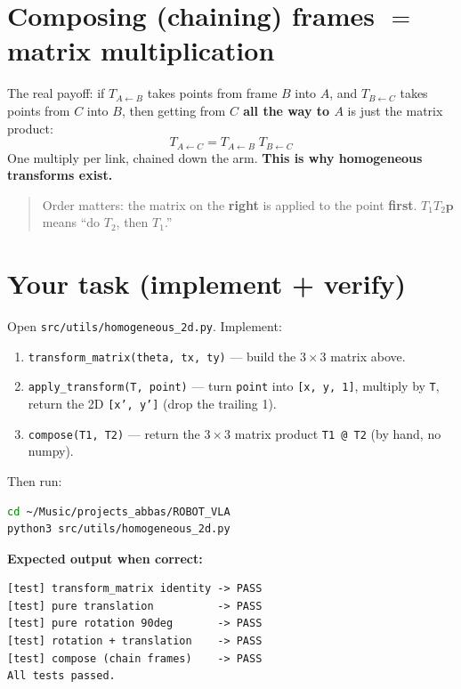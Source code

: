 \documentclass[11pt]{article}
\begin{document}
\section{Composing (chaining) frames $=$ matrix multiplication}

The real payoff: if $T_{A\leftarrow B}$ takes points from frame $B$ into $A$, and
$T_{B\leftarrow C}$ takes points from $C$ into $B$, then getting from \textbf{$C$
all the way to $A$} is just the matrix product:
\[
  T_{A\leftarrow C} = T_{A\leftarrow B}\; T_{B\leftarrow C}
\]
One multiply per link, chained down the arm. \textbf{This is why homogeneous
transforms exist.}

\begin{quote}
Order matters: the matrix on the \textbf{right} is applied to the point
\textbf{first}. $T_1 T_2 \mathbf{p}$ means ``do $T_2$, then $T_1$.''
\end{quote}

\section{Your task (implement + verify)}

Open \texttt{src/utils/homogeneous\_2d.py}. Implement:
\begin{enumerate}[leftmargin=*]
  \item \texttt{transform\_matrix(theta, tx, ty)} --- build the $3\times 3$ matrix
  above.
  \item \texttt{apply\_transform(T, point)} --- turn \texttt{point} into
  \texttt{[x, y, 1]}, multiply by \texttt{T}, return the 2D \texttt{[x', y']}
  (drop the trailing 1).
  \item \texttt{compose(T1, T2)} --- return the $3\times 3$ matrix product
  \texttt{T1 @ T2} (by hand, no numpy).
\end{enumerate}

Then run:
\begin{lstlisting}[language=bash]
cd ~/Music/projects_abbas/ROBOT_VLA
python3 src/utils/homogeneous_2d.py
\end{lstlisting}

\textbf{Expected output when correct:}
\begin{lstlisting}
[test] transform_matrix identity -> PASS
[test] pure translation          -> PASS
[test] pure rotation 90deg       -> PASS
[test] rotation + translation    -> PASS
[test] compose (chain frames)    -> PASS
All tests passed.
\end{lstlisting}
\end{document}
